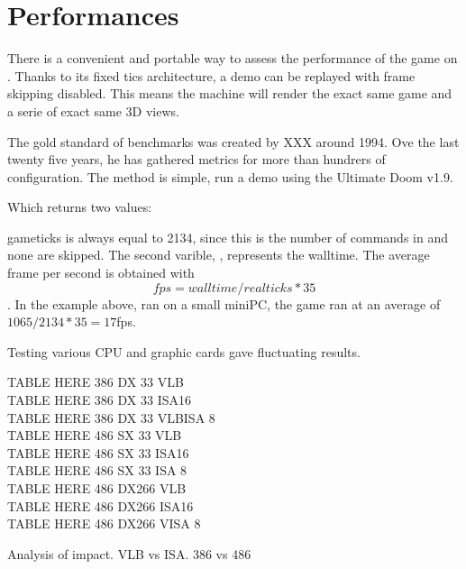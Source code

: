 \section{Performances}
There is a convenient and portable way to assess the performance of the game on \doom. Thanks to its fixed tics architecture, a demo can be replayed with frame skipping disabled. This means the machine will render the exact same game and a serie of exact same 3D views.\\
\par
The gold standard of benchmarks was created by XXX around 1994. Ove the last twenty five years, he has gathered metrics for more than hundrers of configuration. The method is simple, run a demo using the Ultimate Doom v1.9.\\
\par
{}
\par
Which returns two values:\\
\par
{}
\par

gameticks is always equal to 2134, since this is the number of commands in  and none are skipped. The second varible, , represents the walltime. The average frame per second is obtained with $$ fps = walltime/realticks * 35 $$. In the example above, ran on a small miniPC, the game ran at an average of $1065/2134*35 = 17$fps.
\par
Testing various CPU and graphic cards gave fluctuating results.\\
\par
TABLE HERE 386 DX 33   VLB  \\
TABLE HERE 386 DX 33   ISA16\\
TABLE HERE 386 DX 33   VLBISA 8\\
TABLE HERE 486 SX 33   VLB\\
TABLE HERE 486 SX 33   ISA16\\
TABLE HERE 486 SX 33   ISA 8\\
TABLE HERE 486 DX266   VLB\\
TABLE HERE 486 DX266   ISA16\\
TABLE HERE 486 DX266   VISA 8\\
\par 
Analysis of impact. VLB vs ISA. 386 vs 486
